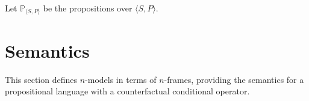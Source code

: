 \documentclass[a4paper, 11pt]{article} %
\newcommand{\tuple}[1]{\langle#1\rangle} %
\renewcommand{\P}[0]{\mathbb{P}}
\begin{document}
\begin{enumerate}
    Let $\P_{\tuple{S,P}}$ be the propositions over $\tuple{S,P}$.
\end{enumerate}




\section{Semantics}

This section defines $n$-models in terms of $n$-frames, providing the semantics for a propositional language with a counterfactual conditional operator.
\end{document}
